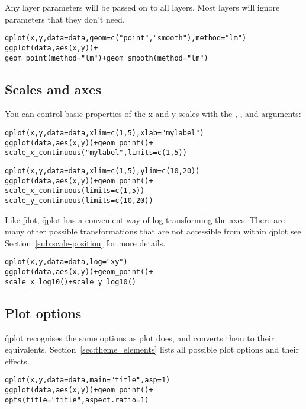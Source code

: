 Any layer parameters will be passed on to all layers.  Most layers will ignore parameters that they don't need.

\begin{alltt}
qplot(x, y, data = data, geom = c("point", "smooth"), method = "lm")
ggplot(data, aes(x, y)) + 
  geom_point(method = "lm") + geom_smooth(method = "lm")
\end{alltt}

\subsection{Scales and axes}

You can control basic properties of the x and y scales with the , ,  and  arguments:

\begin{alltt}
qplot(x, y, data = data, xlim = c(1, 5), xlab = "my label")
ggplot(data, aes(x, y)) + geom_point() + 
  scale_x_continuous("my label", limits = c(1, 5))

qplot(x, y, data = data, xlim = c(1, 5), ylim = c(10, 20))
ggplot(data, aes(x, y)) + geom_point() + 
  scale_x_continuous(limits = c(1, 5))
  scale_y_continuous(limits = c(10, 20))
\end{alltt}

Like \f{plot}, \f{qplot} has a convenient way of log transforming the axes.  There are many other possible transformations that are not accessible from within \f{qplot} see Section~\ref{sub:scale-position} for more details.

\begin{alltt}
qplot(x, y, data = data, log="xy")
ggplot(data, aes(x, y)) + geom_point() + 
  scale_x_log10() + scale_y_log10()
\end{alltt}

\subsection{Plot options}

\f{qplot} recognises the same options as plot does, and converts them to their \ggplot equivalents.  Section~\ref{sec:theme_elements} lists all possible plot options and their effects.

\begin{alltt}
qplot(x, y, data = data, main="title", asp = 1)
ggplot(data, aes(x, y)) + geom_point() + 
  opts(title = "title", aspect.ratio = 1)
\end{alltt}

